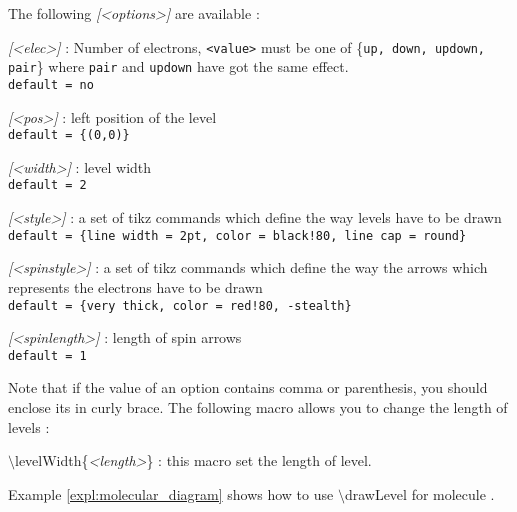 \documentclass[10pt]{article}
\newcommand*{\cmd}[1]{{\ttfamily\color{blue!50!black}$\setminus$#1}\xspace}
\newcommand*{\opt}[1]{{\ttfamily\itshape\color{green!60!black}[<#1>]}\xspace}
\newcommand*{\marg}[1]{{\ttfamily\itshape\color{red!95!black}<#1>}\xspace}
\begin{document}
The following \opt{options} are available :
%
\begin{description}
    \item \opt{elec} : Number of electrons, \texttt{<value>} must be one of \{\texttt{up, down, updown, pair}\} where \texttt{pair} and \texttt{updown} have got the same effect.\\
    \texttt{default = no}
    
    \item \opt{pos} : left position of the level\\
    \texttt{default  = \{(0,0)\}}
    
    \item \opt{width} : level width\\
    \texttt{default = 2}    
    
    \item \opt{style} : a set of tikz commands which define the way levels have to be drawn\\
    \texttt{default = \{line width = 2pt, color = black!80, line cap = round\}}
    
    \item \opt{spinstyle} : a set of tikz commands which define the way the arrows which represents the electrons have to be drawn\\
    \texttt{default = \{very thick, color = red!80, -stealth\}}
    
    \item \opt{spinlength} : length of spin arrows \\
    \texttt{default = 1}
\end{description}

Note that if the value of an option contains comma or parenthesis, you should enclose its in curly brace. The following macro allows you to change the length of levels :
\begin{description}
    \item \cmd{levelWidth}\{\marg{length}\} : this macro set the length of level.
\end{description}

Example \ref{expl:molecular_diagram} shows how to use \cmd{drawLevel} for molecule .
\end{document}
